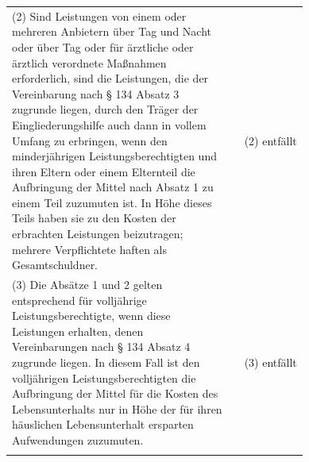 \documentclass[10pt,a4paper,landscape]{article}
\begin{document}
\begin{longtable}{|L{8.2cm}|L{8.2cm}|L{8.2cm}|}
\hhline{|---|}
(2) \textcolor{diffred}{Sind Leistungen von einem oder  \newline mehreren Anbietern über Tag und Nacht  \newline oder über Tag oder für ärztliche oder  \newline ärztlich verordnete Maßnahmen  \newline erforderlich, sind die Leistungen, die der  \newline Vereinbarung nach \S{} 134 Absatz 3  \newline zugrunde liegen, durch den Träger der  \newline Eingliederungshilfe auch dann in vollem  \newline Umfang zu erbringen, wenn den  \newline minderjährigen Leistungsberechtigten und  \newline ihren Eltern oder einem Elternteil die  \newline Aufbringung der Mittel nach Absatz 1 zu  \newline einem Teil zuzumuten ist. In Höhe dieses  \newline Teils haben sie zu den Kosten der  \newline erbrachten Leistungen beizutragen;  \newline mehrere Verpflichtete haften als  \newline Gesamtschuldner.} &  & (2) \textcolor{diffgreen}{entfällt} \\
\hhline{|---|}
(3) \textcolor{diffred}{Die Absätze 1 und 2 gelten  \newline entsprechend für volljährige  \newline Leistungsberechtigte, wenn diese  \newline Leistungen erhalten, denen  \newline Vereinbarungen nach \S{} 134 Absatz 4  \newline zugrunde liegen. In diesem Fall ist den  \newline volljährigen Leistungsberechtigten die  \newline Aufbringung der Mittel für die Kosten des  \newline Lebensunterhalts nur in Höhe der für ihren  \newline häuslichen Lebensunterhalt ersparten  \newline Aufwendungen zuzumuten.} &  & (3) \textcolor{diffgreen}{entfällt} \\
\hhline{|---|}
\end{longtable}
\newpage
\end{document}
